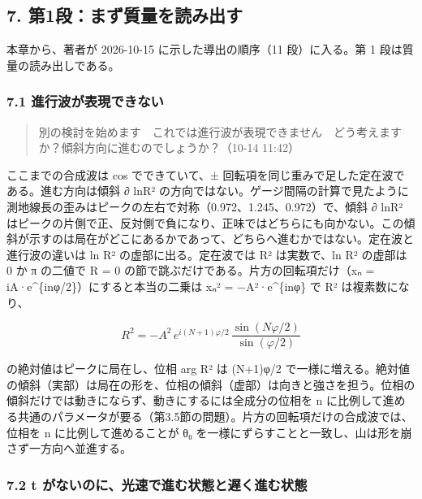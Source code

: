 \documentclass[
  a4paper,
]{ltjsarticle}
\begin{document}
\subsection{7.
第1段：まず質量を読み出す}\label{ux7b2c1ux6bb5ux307eux305aux8ceaux91cfux3092ux8aadux307fux51faux3059}

本章から、著者が 2026-10-15 に示した導出の順序（11 段）に入る。第 1
段は質量の読み出しである。

\subsubsection{7.1
進行波が表現できない}\label{ux9032ux884cux6ce2ux304cux8868ux73feux3067ux304dux306aux3044}

\begin{quote}
別の検討を始めます　これでは進行波が表現できません　どう考えますか？傾斜方向に進むのでしょうか？（10-14
11:42）
\end{quote}

ここまでの合成波は cos でできていて、±
回転項を同じ重みで足した定在波である。進む方向は傾斜 ∂
ln\textbar R²\textbar{}
の方向ではない。ゲージ間隔の計算で見たように測地線長の歪みはピークの左右で対称（0.972、1.245、0.972）で、傾斜
∂ ln\textbar R²\textbar{}
はピークの片側で正、反対側で負になり、正味ではどちらにも向かない。この傾斜が示すのは局在がどこにあるかであって、どちらへ進むかではない。定在波と進行波の違いは
ln R² の虚部に出る。定在波では R² は実数で、ln R² の虚部は 0 か π
の二値で R = 0 の節で跳ぶだけである。片方の回転項だけ（xₙ =
iA·e\^{}\{inφ/2\}）にすると本当の二乗は xₙ² = −A²·e\^{}\{inφ\} で R²
は複素数になり、

\[
R^2=-A^2\,e^{i(N+1)\varphi/2}\,\frac{\sin(N\varphi/2)}{\sin(\varphi/2)}
\]

の絶対値はピークに局在し、位相 arg R² は (N+1)φ/2
で一様に増える。絶対値の傾斜（実部）は局在の形を、位相の傾斜（虚部）は向きと強さを担う。位相の傾斜だけでは動きにならず、動きにするには全成分の位相を
n
に比例して進める共通のパラメータが要る（第3.5節の問題）。片方の回転項だけの合成波では、位相を
n に比例して進めることが θ₀
を一様にずらすことと一致し、山は形を崩さず一方向へ並進する。

\subsubsection{7.2 t
がないのに、光速で進む状態と遅く進む状態}\label{t-ux304cux306aux3044ux306eux306bux5149ux901fux3067ux9032ux3080ux72b6ux614bux3068ux9045ux304fux9032ux3080ux72b6ux614b}
\end{document}
